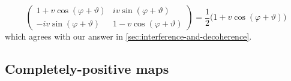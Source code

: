 \documentclass[10pt]{article}
\begin{document}
\begin{itemize}
\begin{equation*}
                            \left(
                            \begin{array}{cc}
                                1+v\cos(\varphi+\vartheta) & iv\sin(\varphi+\vartheta)\\[.6em]
                                -iv\sin(\varphi+\vartheta) & 1-v\cos(\varphi+\vartheta)
                            \end{array}
                            \right)=
                            \frac12\big(1+v\cos(\varphi+\vartheta)\big)
                        \end{equation*}
                        which agrees with our answer in \cref{sec:interference-and-decoherence}.
                \end{itemize}

        \subsection{Completely-positive maps}
\end{document}
